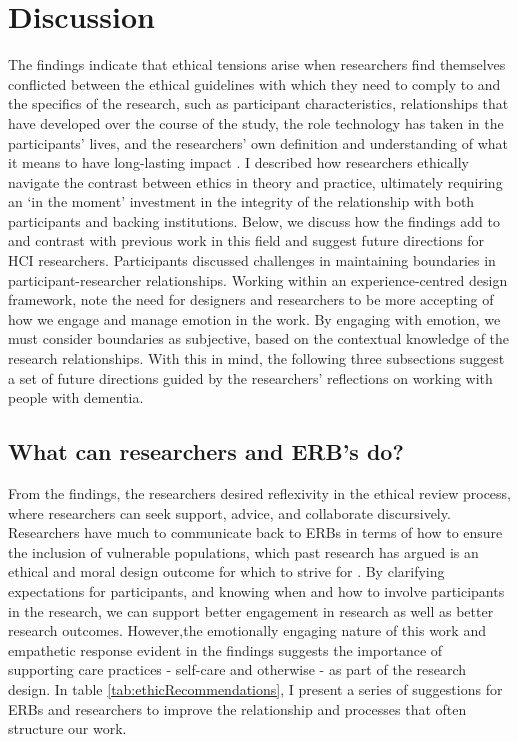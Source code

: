 \section{Discussion}
\label{Ethics:Discussion}
The findings indicate that ethical tensions arise when researchers find themselves conflicted between the ethical guidelines with which they need to comply to and the specifics of the research, such as participant characteristics, relationships that have developed over the course of the study, the role technology has taken in the participants’ lives, and the researchers’ own definition and understanding of what it means to have long-lasting impact \citep{mattsson_praxisrelated_2007}. I described how researchers ethically navigate the contrast between ethics in theory and practice, ultimately requiring an `in the moment' investment in the integrity of the relationship with both participants and backing institutions. Below, we discuss how the findings add to and contrast with previous work in this field and suggest future directions for HCI researchers.
Participants discussed challenges in maintaining boundaries in participant-researcher relationships. Working within an experience-centred design framework, \cite{balaam_emotion_2019} note the need for designers and researchers to be more accepting of how we engage and manage emotion in the work. By engaging with emotion, we must consider boundaries as subjective, based on the contextual knowledge of the research relationships. With this in mind, the following three subsections suggest a set of future directions guided by the researchers' reflections on working with people with dementia.  

\subsection{What can researchers and ERB's do?}
\label{Ethics:WhatCanWeDo}
From the findings, the researchers desired reflexivity in the ethical review process, where researchers can seek support, advice, and collaborate discursively. Researchers have much to communicate back to ERBs in terms of how to ensure the inclusion of vulnerable populations, which past research has argued is an ethical and moral design outcome for which to strive for \citep{scanlon_what_1998}. By clarifying expectations for participants, and knowing when and how to involve participants in the research, we can support better engagement in research as well as better research outcomes. However,the emotionally engaging nature of this work and empathetic response evident in the findings suggests the importance of supporting care practices - self-care and otherwise - as part of the research design. In table \ref{tab:ethicRecommendations}, I present a series of suggestions for ERBs and researchers to improve the relationship and processes that often structure our work.


